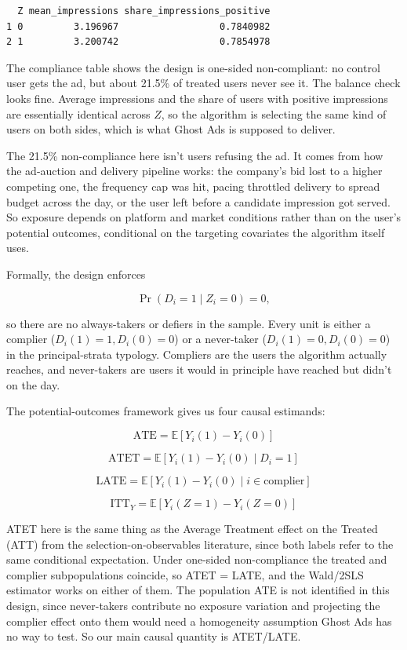 \documentclass[
  letterpaper,
  DIV=11,
  numbers=noendperiod]{scrartcl}
\begin{document}
\begin{verbatim}
  Z mean_impressions share_impressions_positive
1 0         3.196967                  0.7840982
2 1         3.200742                  0.7854978
\end{verbatim}

The compliance table shows the design is one-sided non-compliant: no
control user gets the ad, but about 21.5\% of treated users never see
it. The balance check looks fine. Average impressions and the share of
users with positive impressions are essentially identical across \(Z\),
so the algorithm is selecting the same kind of users on both sides,
which is what Ghost Ads is supposed to deliver.

The 21.5\% non-compliance here isn't users refusing the ad. It comes
from how the ad-auction and delivery pipeline works: the company's bid
lost to a higher competing one, the frequency cap was hit, pacing
throttled delivery to spread budget across the day, or the user left
before a candidate impression got served. So exposure depends on
platform and market conditions rather than on the user's potential
outcomes, conditional on the targeting covariates the algorithm itself
uses.

Formally, the design enforces

\[
\Pr(D_i = 1 \mid Z_i = 0) = 0,
\]

so there are no always-takers or defiers in the sample. Every unit is
either a complier (\(D_i(1) = 1, D_i(0) = 0\)) or a never-taker
(\(D_i(1) = 0, D_i(0) = 0\)) in the principal-strata typology. Compliers
are the users the algorithm actually reaches, and never-takers are users
it would in principle have reached but didn't on the day.

The potential-outcomes framework gives us four causal estimands:

\[
\text{ATE}    = \mathbb{E}[Y_i(1) - Y_i(0)]
\]

\[
\text{ATET}   = \mathbb{E}[Y_i(1) - Y_i(0) \mid D_i = 1]
\]

\[
\text{LATE}   = \mathbb{E}[Y_i(1) - Y_i(0) \mid i \in \text{complier}]
\]

\[
\text{ITT}_Y  = \mathbb{E}[Y_i(Z=1) - Y_i(Z=0)]
\]

ATET here is the same thing as the Average Treatment effect on the
Treated (ATT) from the selection-on-observables literature, since both
labels refer to the same conditional expectation. Under one-sided
non-compliance the treated and complier subpopulations coincide, so ATET
= LATE, and the Wald/2SLS estimator works on either of them. The
population ATE is not identified in this design, since never-takers
contribute no exposure variation and projecting the complier effect onto
them would need a homogeneity assumption Ghost Ads has no way to test.
So our main causal quantity is ATET/LATE.
\end{document}
